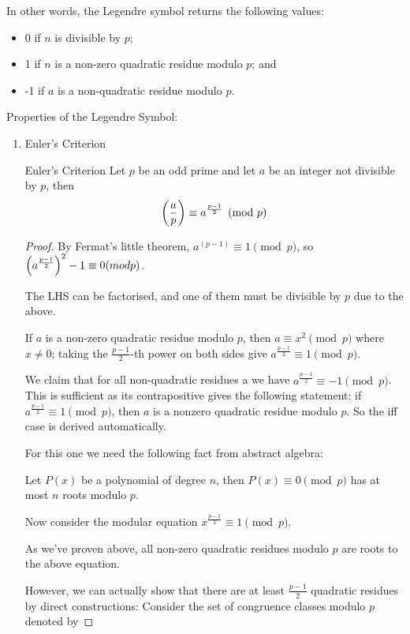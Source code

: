 In other words, the Legendre symbol returns the following values:
\begin{itemize}
\item 0 if $n$ is divisible by $p$;
\item 1 if $n$ is a non-zero quadratic residue modulo $p$; and
\item -1 if $a$ is a non-quadratic residue modulo $p$.
\end{itemize}

Properties of the Legendre Symbol:
\begin{enumerate}
\item Euler's Criterion

\begin{thrm}{Euler's Criterion}{}
Let $p$ be an odd prime and let $a$ be an integer not divisible by $p$, then
\begin{equation}
\left(\dfrac{a}{p}\right) \equiv a^{\frac{p-1}{2}} \pmod p
\end{equation}
\end{thrm}

\begin{proof}
By Fermat's little theorem, $a^(p-1) \equiv 1 \pmod p$, so $\left(a^{\frac{p-1}{2}}\right)^2 - 1 \equiv 0 (mod p)$.

The LHS can be factorised, and one of them must be divisible by $p$ due to the above.

If $a$ is a non-zero quadratic residue modulo $p$, then $a \equiv x^2 \pmod p$ where $x \neq 0$; taking the $\frac{p-1}{2}$-th power on both sides give $a^{\frac{p-1}{2}} \equiv 1 \pmod p$.

We claim that for all non-quadratic residues a we have $a^{\frac{p-1}{2}} \equiv -1 \pmod p$. This is sufficient as its contrapositive gives the following statement: if $a^{\frac{p-1}{2}} \equiv 1 \pmod p$, then $a$ is a nonzero quadratic residue modulo $p$. So the iff case is derived automatically.

For this one we need the following fact from abstract algebra: 
\begin{lemma}
Let $P(x)$ be a polynomial of degree $n$, then $P(x) \equiv 0 \pmod p$ has at most $n$ roots modulo $p$.
\end{lemma}

Now consider the modular equation
$x^{\frac{p-1}{2}} \equiv 1 \pmod p$.

As we've proven above, all non-zero quadratic residues modulo $p$ are roots to the above equation. 

However, we can actually show that there are at least $\frac{p-1}{2}$ quadratic residues by direct constructions: Consider the set of congruence classes modulo $p$ denoted by  


\end{proof}
\end{enumerate}
